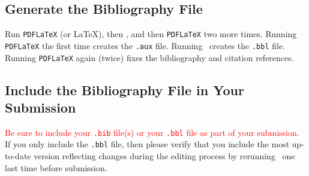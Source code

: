 \documentclass{scspaperproc}
\theoremstyle{scsthe}
\begin{document}







    \subsection{Generate the Bibliography File}

    Run \texttt{PDFLaTeX} (or \LaTeX), then \BibTeX, and then \texttt{PDFLaTeX} two more times. Running \texttt{PDFLaTeX} the first time creates the \texttt{.aux} file. Running \BibTeX\ creates the \texttt{.bbl} file.  Running \texttt{PDFLaTeX} again (twice) fixes the bibliography and citation references.


    \subsection{Include the Bibliography File in Your Submission}
    \label{sec:submitbib}

    \textcolor{red}{Be sure to include your \texttt{.bib} file(s) or your \texttt{.bbl} file as part of your submission}. If you only include the \texttt{.bbl} file, then please verify that you include the most up-to-date version reflecting changes during the editing process by rerunning \BibTeX\ one last time before submission.
\end{document}
